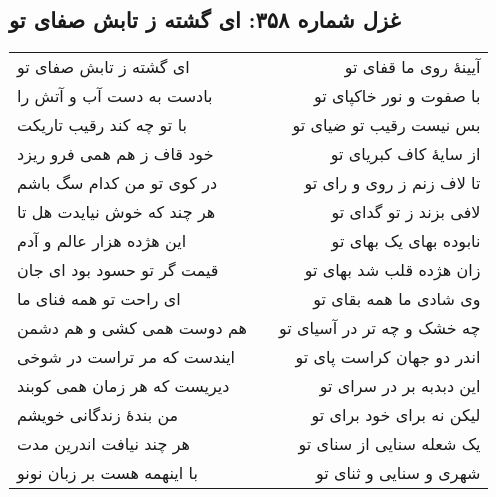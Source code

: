 \begin{center}
\section*{غزل شماره ۳۵۸: ای گشته ز تابش صفای تو}
\label{sec:358}
\begin{longtable}{l p{0.5cm} r}
ای گشته ز تابش صفای تو
&&
آیینهٔ روی ما قفای تو
\\
بادست به دست آب و آتش را
&&
با صفوت و نور خاکپای تو
\\
با تو چه کند رقیب تاریکت
&&
بس نیست رقیب تو ضیای تو
\\
خود قاف ز هم همی فرو ریزد
&&
از سایهٔ کاف کبریای تو
\\
در کوی تو من کدام سگ باشم
&&
تا لاف زنم ز روی و رای تو
\\
هر چند که خوش نیایدت هل تا
&&
لافی بزند ز تو گدای تو
\\
این هژده هزار عالم و آدم
&&
نابوده بهای یک بهای تو
\\
قیمت گر تو حسود بود ای جان
&&
زان هژده قلب شد بهای تو
\\
ای راحت تو همه فنای ما
&&
وی شادی ما همه بقای تو
\\
هم دوست همی کشی و هم دشمن
&&
چه خشک و چه تر در آسیای تو
\\
ایندست که مر تراست در شوخی
&&
اندر دو جهان کراست پای تو
\\
دیریست که هر زمان همی کوبند
&&
این دبدبه بر در سرای تو
\\
من بندهٔ زندگانی خویشم
&&
لیکن نه برای خود برای تو
\\
هر چند نیافت اندرین مدت
&&
یک شعله سنایی از سنای تو
\\
با اینهمه هست بر زبان نونو
&&
شهری و سنایی و ثنای تو
\\
\end{longtable}
\end{center}
